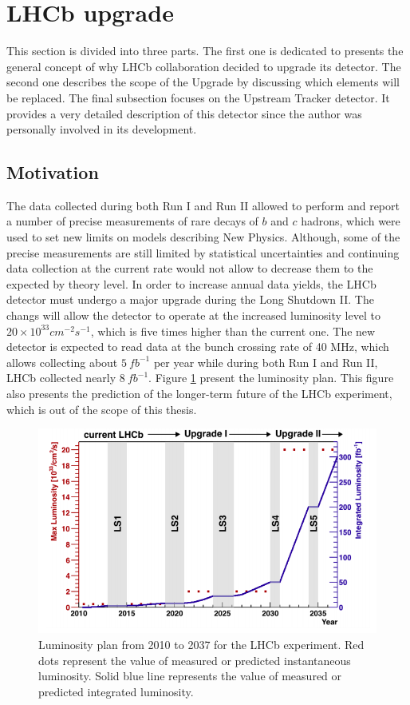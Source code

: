 \section{LHCb upgrade}
This section is divided into three parts. The first one is dedicated to presents the general concept of why LHCb collaboration decided to upgrade its detector. The second one describes the scope of the Upgrade by discussing which elements will be replaced. The final subsection focuses on the Upstream Tracker detector. It provides a very detailed description of this detector since the author was personally involved in its development.  

\subsection{Motivation}

The data collected during both Run I and Run II allowed to perform and report a number of precise measurements of rare decays of $b$ and $c$ hadrons, which were used to set new limits on models describing New Physics. Although, some of the precise measurements are still limited by statistical uncertainties and continuing data collection at the current rate would not allow to decrease them to the expected by theory level. In order to increase annual data yields, the LHCb detector must undergo a major upgrade during the Long Shutdown II.  The changs will allow the detector to operate at the increased luminosity level to $20 \times 10^{33} cm^{-2}s^{-1}$, which is five times higher than the current one. The new detector is expected to read data at the bunch crossing rate of 40 MHz, which allows collecting about $5~ fb^{-1}$ per year while during both Run I and Run II, LHCb collected nearly $8~ fb^{-1}$. Figure \ref{fig:lhcb_lumi} present the luminosity plan. This figure also presents the prediction of the longer-term future of the LHCb experiment, which is out of the scope of this thesis.  

\begin{figure}[!h]
\centering
\includegraphics[width=\linewidth]{figures/lhcb_lumi.PNG}
\caption{Luminosity plan from 2010 to 2037 for the LHCb experiment. Red dots represent
the value of measured or predicted instantaneous luminosity. Solid blue line represents the value of measured or predicted integrated luminosity.
\label{fig:lhcb_lumi}}
\end{figure}


